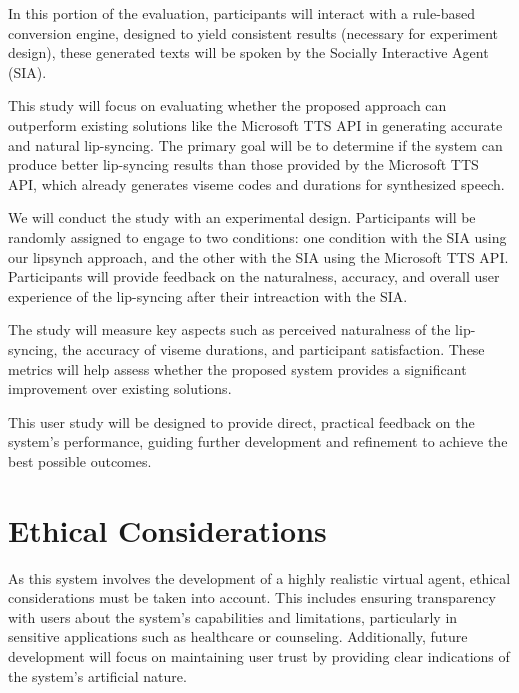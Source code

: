 \documentclass[12pt]{article}
\begin{document}


In this portion of the evaluation, participants will interact with a rule-based conversion engine, designed to yield consistent results (necessary for experiment design), these generated texts will be spoken by the Socially Interactive Agent (SIA). 

This study will focus on evaluating whether the proposed approach can outperform existing solutions like the Microsoft TTS API in generating accurate and natural lip-syncing. The primary goal will be to determine if the system can produce better lip-syncing results than those provided by the Microsoft TTS API, which already generates viseme codes and durations for synthesized speech. 

We will conduct the study with an experimental design.
Participants will be randomly assigned to engage to two conditions: one condition with the SIA using our lipsynch approach, and the other with the SIA using the Microsoft TTS API. Participants will provide feedback on the naturalness, accuracy, and overall user experience of the lip-syncing after their intreaction with the SIA. 

The study will measure key aspects such as perceived naturalness of the lip-syncing, the accuracy of viseme durations, and participant satisfaction. These metrics will help assess whether the proposed system provides a significant improvement over existing solutions.

This user study will be designed to provide direct, practical feedback on the system’s performance, guiding further development and refinement to achieve the best possible outcomes.

\section{Ethical Considerations}

As this system involves the development of a highly realistic virtual agent, ethical considerations must be taken into account. This includes ensuring transparency with users about the system's capabilities and limitations, particularly in sensitive applications such as healthcare or counseling. Additionally, future development will focus on maintaining user trust by providing clear indications of the system's artificial nature.



\end{document}
